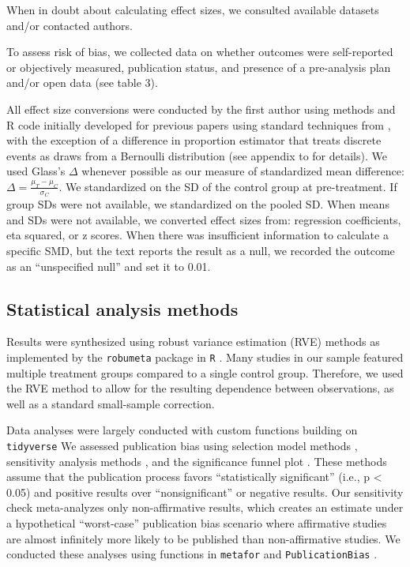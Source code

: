 \documentclass[sn-nature,referee,pdflatex]{sn-jnl}
\begin{document}
When in doubt about calculating effect sizes, we consulted available
datasets and/or contacted authors.

To assess risk of bias, we collected data on whether outcomes were
self-reported or objectively measured, publication status, and presence
of a pre-analysis plan and/or open data (see table 3).

All effect size conversions were conducted by the first author using
methods and R code initially developed for previous papers
\citep{paluck2019, paluck2021, porat2024} using standard techniques from
\citep{cooper2019}, with the exception of a difference in proportion
estimator that treats discrete events as draws from a Bernoulli
distribution (see appendix to \citep{paluck2021} for details). We used
Glass's \(\Delta\) whenever possible as our measure of standardized mean
difference: \(\Delta = \frac{\mu_T - \mu_C}{\sigma_C}\). We standardized
on the SD of the control group at pre-treatment. If group SDs were not
available, we standardized on the pooled SD. When means and SDs were not
available, we converted effect sizes from: regression coefficients, eta
squared, or z scores. When there was insufficient information to
calculate a specific SMD, but the text reports the result as a null, we
recorded the outcome as an ``unspecified null'' and set it to 0.01.

\subsection{Statistical analysis methods}\label{sec3.4}

Results were synthesized using robust variance estimation (RVE) methods
\citep{hedges2010} as implemented by the \texttt{robumeta} package
\citep{fisher2015} in \texttt{R} \citep{Rlang}. Many studies in our
sample featured multiple treatment groups compared to a single control
group. Therefore, we used the RVE method to allow for the resulting
dependence between observations, as well as a standard small-sample
correction.

Data analyses were largely conducted with custom functions building on
\texttt{tidyverse} \citep{wickham2019} We assessed publication bias
using selection model methods \citep{hedges1992, vevea1995}, sensitivity
analysis methods \citep{mathur2024}, and the significance funnel plot
\citep{mathur2020}. These methods assume that the publication process
favors ``statistically significant'' (i.e., p \textless{} 0.05) and
positive results over ``nonsignificant'' or negative results. Our
sensitivity check meta-analyzes only non-affirmative results, which
creates an estimate under a hypothetical ``worst-case'' publication bias
scenario where affirmative studies are almost infinitely more likely to
be published than non-affirmative studies. We conducted these analyses
using functions in \texttt{metafor} \citep{viechtbauer2010} and
\texttt{PublicationBias} \citep{mathur2020, mathur2024}.
\end{document}
